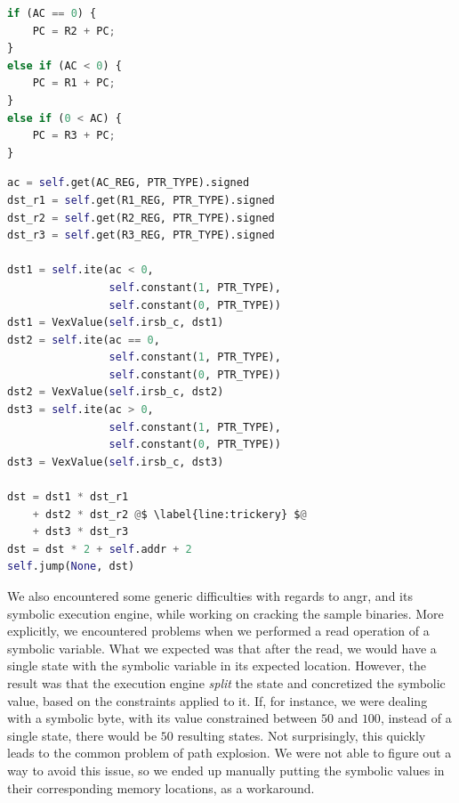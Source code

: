 \begin{center}

\begin{minipage}[t]{.27\textwidth}
    \begin{lstlisting}[language=python, label={lst:cond_jmp}, caption={\raggedright Cleaned-up decompilation, extracted from Ghidra, of the instruction handler number $111$ from the \cc{vmwhere} embedded \gls{VM}. It performs a conditional jump, based on the value of the \cc{AC} register.}]
if (AC == 0) {
    PC = R2 + PC;
}
else if (AC < 0) {
    PC = R1 + PC;
}
else if (0 < AC) {
    PC = R3 + PC;
}
\end{lstlisting}
\end{minipage}
\hspace{1.3cm}
\begin{minipage}[t]{.60\textwidth}
    \begin{lstlisting}[language=python, label={lst:vex_cond_jmp}, caption={\raggedright Python code which lifts bytecode encoding the conditional jump instruction from Listing \ref{lst:cond_jmp} into VEX IR.}]
ac = self.get(AC_REG, PTR_TYPE).signed
dst_r1 = self.get(R1_REG, PTR_TYPE).signed
dst_r2 = self.get(R2_REG, PTR_TYPE).signed
dst_r3 = self.get(R3_REG, PTR_TYPE).signed

dst1 = self.ite(ac < 0,
                self.constant(1, PTR_TYPE),
                self.constant(0, PTR_TYPE))
dst1 = VexValue(self.irsb_c, dst1)
dst2 = self.ite(ac == 0,
                self.constant(1, PTR_TYPE),
                self.constant(0, PTR_TYPE))
dst2 = VexValue(self.irsb_c, dst2)
dst3 = self.ite(ac > 0,
                self.constant(1, PTR_TYPE),
                self.constant(0, PTR_TYPE))
dst3 = VexValue(self.irsb_c, dst3)

dst = dst1 * dst_r1 
    + dst2 * dst_r2 @$ \label{line:trickery} $@
    + dst3 * dst_r3
dst = dst * 2 + self.addr + 2
self.jump(None, dst)
\end{lstlisting}
\end{minipage}

\end{center}

We also encountered some generic difficulties with regards to angr, and its symbolic execution engine, while working on cracking the sample binaries. More explicitly, we encountered problems when we performed a read operation of a symbolic variable. What we expected was that after the read, we would have a single state with the symbolic variable in its expected location. However, the result was that the execution engine \emph{split} the state and concretized the symbolic value, based on the constraints applied to it. If, for instance, we were dealing with a symbolic byte, with its value constrained between $50$ and $100$, instead of a single state, there would be $50$ resulting states. Not surprisingly, this quickly leads to the common problem of path explosion. We were not able to figure out a way to avoid this issue, so we ended up manually putting the symbolic values in their corresponding memory locations, as a workaround.

